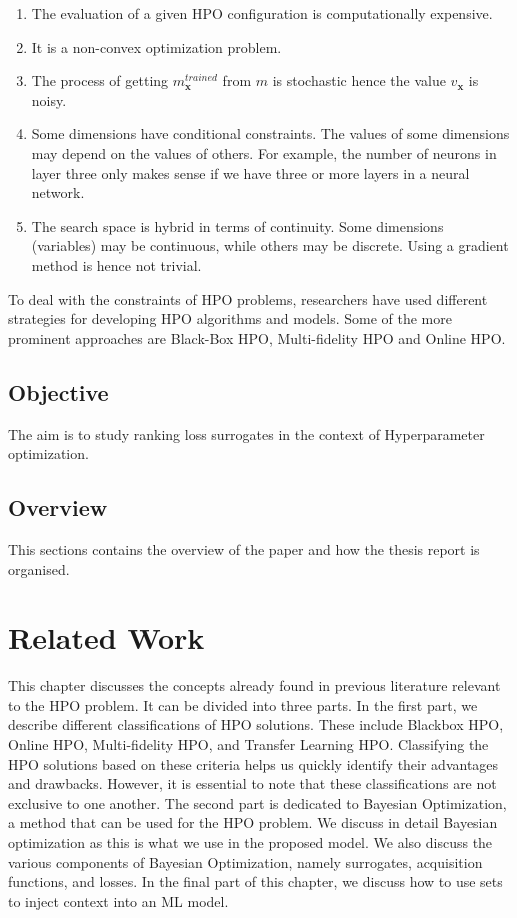 \documentclass[12pt, twoside, ngerman]{report}
\begin{document}
\begin{enumerate}
\item The evaluation of a given HPO configuration is computationally expensive.
\item It is a non-convex optimization problem.
\item The process of getting $m^{trained}_\textbf{x}$ from $m$ is stochastic hence the value $v_{\textbf{x}}$ is noisy.
\item Some dimensions have conditional constraints. The values of some dimensions may depend on the values of others. For example, the number of neurons in layer three only makes sense if we have three or more layers in a neural network.
\item The search space is hybrid in terms of continuity. Some dimensions (variables) may be continuous, while others may be discrete.
Using a gradient method is hence not trivial.
\end{enumerate}

To deal with the constraints of HPO problems, researchers have used different strategies for developing HPO algorithms and models.
Some of the more prominent approaches are Black-Box HPO, 
Multi-fidelity HPO and Online HPO.

\label{ProblemOverviewlabel}
\section{Objective}
The aim is to study ranking loss surrogates in the context of Hyperparameter optimization.

\section{Overview}
This sections contains the overview of the paper and how the thesis report is organised.


\chapter{Related Work}\label{chap:relatedWork}

This chapter discusses the concepts already found in previous literature relevant to the HPO problem. It can be divided into three parts.
In the first part, we describe different classifications of HPO solutions. These include Blackbox HPO, Online HPO, Multi-fidelity HPO, and Transfer Learning HPO. Classifying the HPO solutions based on these criteria helps us quickly identify their advantages and drawbacks. However, it is essential to note that these classifications are not exclusive to one another. 
The second part is dedicated to Bayesian Optimization, a method that can be used for the HPO problem. We discuss in detail Bayesian optimization as this is what we use in the proposed model. We also discuss the various components of Bayesian Optimization, namely surrogates, acquisition functions, and losses.
In the final part of this chapter, we discuss how to use sets to inject context into an ML model.
\end{document}
